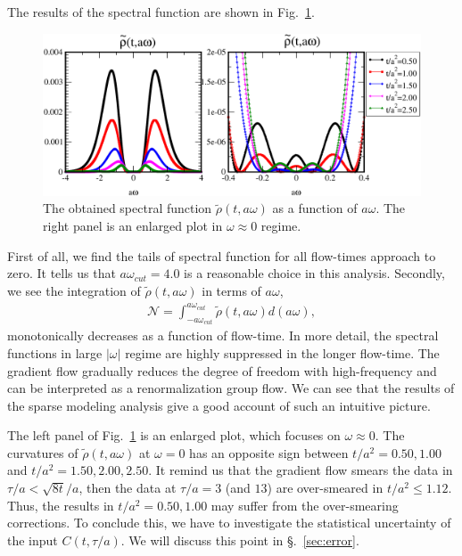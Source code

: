 \documentclass[a4paper,11pt]{article}
\newcommand\beq{ \begin{eqnarray} }
\newcommand\eeq{ \end{eqnarray} }
\begin{document}
The results of the spectral function are shown in Fig.~\ref{fig:rho-center}.
\begin{figure}[h]
\begin{center}
\includegraphics[scale=0.5]{./rho-center-ft-deps.pdf}
\caption{The obtained spectral function $\tilde{\rho}(t, a\omega)$ as a function of $a \omega$.  The right panel is an enlarged plot in $\omega \approx 0$ regime.   }
\label{fig:rho-center}
\end{center}
\end{figure}
First of all, we find the tails of spectral function for all flow-times approach to zero.
It tells us that  $a \omega_{cut}=4.0$ is a reasonable choice in this analysis.
Secondly, we see the integration of $\tilde{\rho}(t,a\omega)$ in terms of $a \omega$, 
\beq
{\mathcal N}=\int_{-a\omega_{cut}}^{a\omega_{cut}} \tilde{\rho}(t,a\omega) d (a\omega),\label{eq:N}
\eeq
monotonically decreases as a function of flow-time.
In more detail, the spectral functions in large $|\omega|$ regime are highly suppressed in the longer flow-time.
The gradient flow gradually reduces the degree of freedom with high-frequency and can be interpreted as a renormalization group flow.
We can see that the results of the sparse modeling analysis give a good account of such an intuitive picture.


The left panel of Fig.~\ref{fig:rho-center} is an enlarged plot, which focuses on $\omega \approx 0$.
The curvatures of $\tilde{\rho}(t,a \omega)$ at $\omega=0$ has an opposite sign between  $t/a^2 =0.50,1.00$ and $t/a^2=1.50,2.00,2.50$.
It remind us that the gradient flow smears the data in $\tau/a < \sqrt{8t}/a$, then the data at $\tau/a =3$ (and $13$) are over-smeared in $t/a^2 \le 1.12$.
Thus, the results in $t/a^2=0.50,1.00$ may suffer from the over-smearing corrections.
To conclude this, we have to investigate the statistical uncertainty of the input $C(t,\tau/a)$.
We will discuss this point in \S.~\ref{sec:error}.
\end{document}
